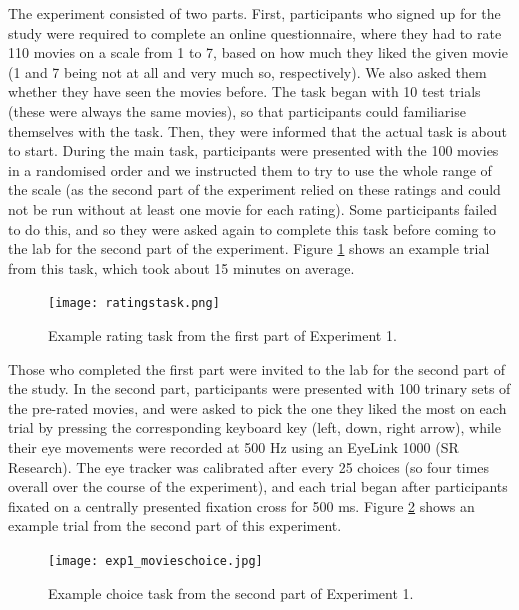 \documentclass[11pt,a4paper]{article}
\begin{document}
The experiment consisted of two parts. First, participants who signed up for the study were required to complete an online questionnaire, where they had to rate 110 movies on a scale from 1 to 7, based on how much they liked the given movie (1 and 7 being not at all and very much so, respectively). We also asked them whether they have seen the movies before. The task began with 10 test trials (these were always the same movies), so that participants could familiarise themselves with the task. Then, they were informed that the actual task is about to start. During the main task, participants were presented with the 100 movies in a randomised order and we instructed them to try to use the whole range of the scale (as the second part of the experiment relied on these ratings and could not be run without at least one movie for each rating). Some participants failed to do this, and so they were asked again to complete this task before coming to the lab for the second part of the experiment. Figure \ref{fig:ratingstask} shows an example trial from this task, which took about 15 minutes on average. 

\begin{figure}
\captionsetup{justification=centering}
\centering
\caption{Example rating task from the first part of Experiment 1. }
\texttt{[image: ratingstask.png]}
\label{fig:ratingstask}
\end{figure}

Those who completed the first part were invited to the lab for the second part of the study. In the second part, participants were presented with 100 trinary sets of the pre-rated movies, and were asked to pick the one they liked the most on each trial by pressing the corresponding keyboard key (left, down, right arrow), while their eye movements were recorded at 500 Hz using an EyeLink 1000 (SR Research). The eye tracker was calibrated after every 25 choices (so four times overall over the course of the experiment), and each trial began after participants fixated on a centrally presented fixation cross for 500 ms. Figure \ref{fig:exp1_movieschoice} shows an example trial from the second part of this experiment.

\begin{figure}
\captionsetup{justification=centering}
\centering
\caption{Example choice task from the second part of Experiment 1. }
\texttt{[image: exp1\_movieschoice.jpg]}
\label{fig:exp1_movieschoice}
\end{figure}
\end{document}
